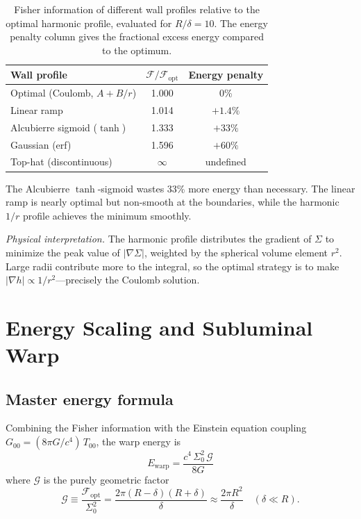 \documentclass[prd,twocolumn,superscriptaddress,longbibliography]{revtex4-2}
\newcommand{\Ewarp}{E_{\mathrm{warp}}}
\newcommand{\Fisher}{\mathcal{F}}
\newcommand{\Ggeom}{\mathcal{G}}
\begin{document}
\begin{table}[t]
\centering
\caption{Fisher information of different wall profiles relative
to the optimal harmonic profile, evaluated for $R/\delta = 10$.
The energy penalty column gives the fractional excess energy
compared to the optimum.}
\label{tab:shapes}
\begin{ruledtabular}
\begin{tabular}{lcc}
Wall profile & $\Fisher/\Fisher_{\mathrm{opt}}$ & Energy penalty \\
\hline
Optimal (Coulomb, $A + B/r$) & 1.000 & 0\% \\
Linear ramp & 1.014 & $+1.4\%$ \\
Alcubierre sigmoid ($\tanh$) & 1.333 & $+33\%$ \\
Gaussian (erf) & 1.596 & $+60\%$ \\
Top-hat (discontinuous) & $\infty$ & undefined \\
\end{tabular}
\end{ruledtabular}
\end{table}

The Alcubierre $\tanh$-sigmoid wastes 33\% more energy than
necessary.  The linear ramp is nearly optimal but non-smooth at
the boundaries, while the harmonic $1/r$ profile achieves the
minimum smoothly.

\textit{Physical interpretation.}\;
The harmonic profile distributes the gradient of $\Sigma$ to
minimize the peak value of $|\nabla\Sigma|$, weighted by the
spherical volume element $r^2$.  Large radii contribute more to
the integral, so the optimal strategy is to make
$|\nabla h| \propto 1/r^2$---precisely the Coulomb solution.

\section{Energy Scaling and Subluminal Warp}
\label{sec:energy}

\subsection{Master energy formula}

Combining the Fisher information with the Einstein equation
coupling $G_{00} = (8\pi G/c^4)\,T_{00}$, the warp energy is
\begin{equation}
\label{eq:master}
\boxed{
\Ewarp = \frac{c^4\,\Sigma_0^2\,\Ggeom}{8G}
}
\end{equation}
where $\Ggeom$ is the purely geometric factor
\begin{equation}
\Ggeom \equiv \frac{\Fisher_{\mathrm{opt}}}{\Sigma_0^2}
= \frac{2\pi(R-\delta)(R+\delta)}{\delta}
\approx \frac{2\pi R^2}{\delta}
\quad(\delta \ll R).
\end{equation}
\end{document}
